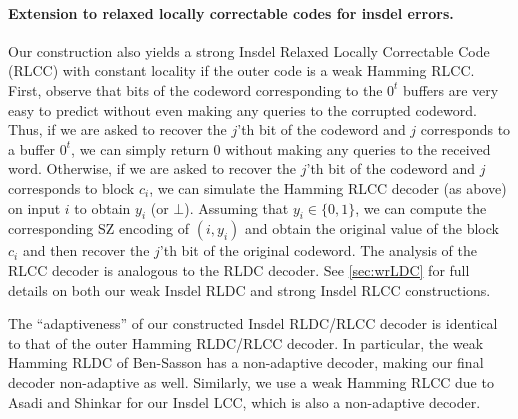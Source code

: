 
\paragraph{Extension to relaxed locally correctable codes for insdel errors.}
Our construction also yields a strong Insdel Relaxed Locally Correctable Code (RLCC) with constant locality if the outer code is a weak Hamming RLCC. 
First, observe that bits of the codeword corresponding to the $0^t$ buffers are very easy to predict without even making any queries to the corrupted codeword. 
Thus, if we are asked to recover the $j$'th bit of the codeword and $j$ corresponds to a buffer $0^t$, we can simply return $0$ without making any queries to the received word. 
Otherwise, if we are asked to recover the $j$'th bit of the codeword and $j$ corresponds to block $c_i$, we can simulate the Hamming RLCC decoder (as above) on input $i$ to obtain $y_i$ (or $\bot$). 
Assuming that $y_i \in \{0,1\}$, we can compute the corresponding SZ encoding of $(i,y_i)$ and obtain the original value of the block $c_i$ and then recover the $j$'th bit of the original codeword.
The analysis of the RLCC decoder is analogous to the RLDC decoder.
See \cref{sec:wrLDC} for full details on both our weak Insdel RLDC and strong Insdel RLCC constructions.
\begin{remark}
    The ``adaptiveness'' of our constructed Insdel RLDC/RLCC decoder is identical to that of the outer Hamming RLDC/RLCC decoder.
    In particular, the weak Hamming RLDC of Ben-Sasson \etal \cite{Ben-SassonGHSV06} has a non-adaptive decoder, making our final decoder non-adaptive as well.
    Similarly, we use a weak Hamming RLCC due to Asadi and Shinkar \cite{AsadiS21} for our Insdel LCC, which is also a non-adaptive decoder.
\end{remark}


